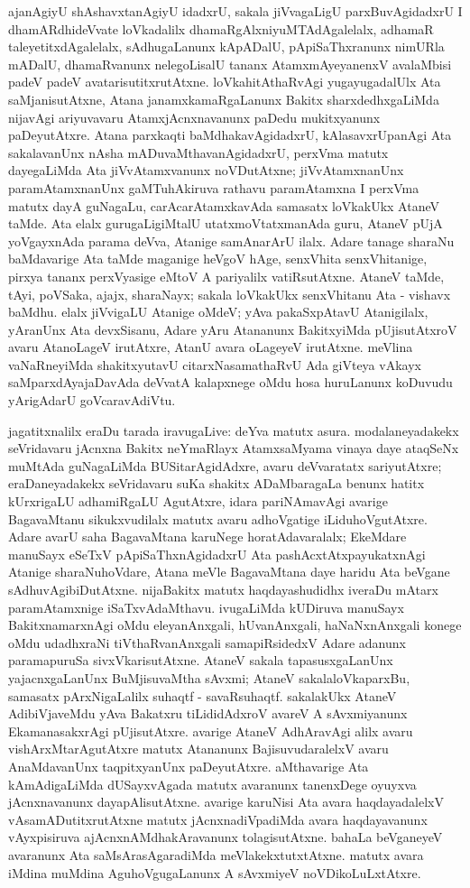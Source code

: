 ajanAgiyU shAshavxtanAgiyU idadxrU, sakala jiVvagaLigU parxBuvAgidadxrU I dhamARdhideVvate loVkadalilx dhamaRgAlxniyuMTAdAgalelalx, adhamaR taleyetitx\-dAgalelalx, sAdhugaLanunx kApADalU, pApiSaThxranunx nimURla mADalU, dhamaRvanunx nelegoLisalU tananx AtamxmAyeyanenxV avalaMbisi padeV padeV avatarisutitxrutAtxne. loVkahitAthaRvAgi yugayugadalUlx Ata saMjanisutAtxne, Atana janamxkamaRgaLanunx Bakitx sharxdedhxgaLiMda nijavAgi ariyuvavaru AtamxjAcnxnavanunx paDedu mukitxyanunx paDeyutAtxre. Atana parxkaqti baMdhakavAgidadxrU, kAlasavxrUpanAgi Ata sakalavanUnx nAsha mADuvaMthavanAgidadxrU, perxVma matutx dayegaLiMda Ata jiVvAtamxvanunx noVDutAtxne; jiVvAtamxnanUnx paramAtamxnanUnx gaMTuhAkiruva rathavu paramAtamxna I perxVma matutx dayA guNagaLu, carAcarAtamxkavAda samasatx loVkakUkx AtaneV taMde. Ata elalx gurugaLigiMtalU utatxmoVtatxmanAda guru, AtaneV pUjA yoVgayxnAda parama deVva, Atanige samAnarArU ilalx. Adare tanage sharaNu baMdavarige Ata taMde maganige heVgoV hAge, senxVhita senxVhitanige, pirxya tananx perxVyasige eMtoV A pariyalilx vatiRsutAtxne. AtaneV taMde, tAyi, poVSaka, ajajx, sharaNayx; sakala loVkakUkx senxVhitanu Ata - vishavx baMdhu. elalx jiVvigaLU Atanige oMdeV; yAva pakaSxpAtavU Atanigilalx, yAranUnx Ata devxSisanu, Adare yAru Atananunx BakitxyiMda pUjisutAtxroV avaru AtanoLageV irutAtxre, AtanU avara oLageyeV irutAtxne. meVlina vaNaRneyiMda shakitxyutavU citarxNasamathaRvU Ada giVteya vAkayx saMparxdAyajaDavAda deVvatA kalapxnege oMdu hosa huruLanunx koDuvudu yArigAdarU goVcaravAdiVtu.

jagatitxnalilx eraDu tarada iravugaLive: deYva matutx asura. modalaneyadakekx seVridavaru jAcnxna Bakitx neYmaRlayx AtamxsaMyama vinaya daye ataqSeNx muMtAda guNagaLiMda BUSitarAgidAdxre, avaru deVvaratatx sariyutAtxre; eraDaneyadakekx seVridavaru suKa shakitx ADaMbaragaLa benunx hatitx kUrxrigaLU adhamiRgaLU AgutAtxre, idara pariNAmavAgi avarige BagavaMtanu sikukxvudilalx matutx avaru adhoVgatige iLiduhoVgutAtxre. Adare avarU saha BagavaMtana karuNege horatAdavaralalx; EkeMdare manuSayx eSeTxV pApiSaThxnAgidadxrU Ata pashAcxtAtxpayukatxnAgi Atanige sharaNuhoVdare, Atana meVle BagavaMtana daye haridu Ata beVgane sAdhuvAgibiDutAtxne. nijaBakitx matutx haqdayashudidhx iveraDu mAtarx paramAtamxnige iSaTxvAdaMthavu. ivugaLiMda kUDiruva manuSayx BakitxnamarxnAgi oMdu eleyanAnxgali, hUvanAnxgali, haNaNxnAnxgali konege oMdu udadhxraNi tiVthaRvanAnxgali samapiRsidedxV Adare adanunx paramapuruSa sivxVkarisutAtxne. AtaneV sakala tapasusxgaLanUnx yajacnxgaLanUnx BuMjisuvaMtha sAvxmi; AtaneV sakalaloVkaparxBu, samasatx pArxNigaLalilx suhaqtf - savaRsuhaqtf. sakalakUkx AtaneV AdibiVjaveMdu yAva Bakatxru tiLididAdxroV avareV A sAvxmiyanunx EkamanasakxrAgi pUjisutAtxre. avarige AtaneV AdhAravAgi alilx avaru vishArxMtarAgutAtxre matutx Atananunx BajisuvudaralelxV avaru AnaMdavanUnx taqpitxyanUnx paDeyutAtxre. aMthavarige Ata kAmAdigaLiMda dUSayxvAgada matutx avaranunx tanenxDege oyuyxva jAcnxnavanunx dayapAlisutAtxne. avarige karuNisi Ata avara haqdayadalelxV vAsamADutitxrutAtxne matutx jAcnxnadiVpadiMda avara haqdayavanunx vAyxpisiruva ajAcnxnAMdhakAravanunx tolagisutAtxne. bahaLa beVganeyeV avaranunx Ata saMsArasAgaradiMda meVlakekxtutxtAtxne. matutx avara iMdina muMdina AguhoVgugaLanunx A sAvxmiyeV noVDikoLuLxtAtxre.

